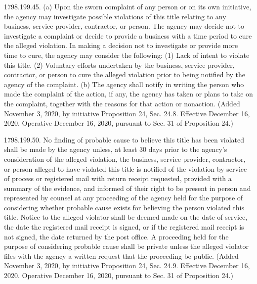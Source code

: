 1798.199.45.  (a) Upon the sworn complaint of any person or on its own initiative, the agency may investigate possible violations of this title relating to any business, service provider, contractor, or person. The agency may decide not to investigate a complaint or decide to provide a business with a time period to cure the alleged violation. In making a decision not to investigate or provide more time to cure, the agency may consider the following:
(1) Lack of intent to violate this title.
(2) Voluntary efforts undertaken by the business, service provider, contractor, or person to cure the alleged violation prior to being notified by the agency of the complaint.
(b) The agency shall notify in writing the person who made the complaint of the action, if any, the agency has taken or plans to take on the complaint, together with the reasons for that action or nonaction.
(Added November 3, 2020, by initiative Proposition 24, Sec. 24.8. Effective December 16, 2020. Operative December 16, 2020, pursuant to Sec. 31 of Proposition 24.)

1798.199.50.  No finding of probable cause to believe this title has been violated shall be made by the agency unless, at least 30 days prior to the agency’s consideration of the alleged violation, the business, service provider, contractor, or person alleged to have violated this title is notified of the violation by service of process or registered mail with return receipt requested, provided with a summary of the evidence, and informed of their right to be present in person and represented by counsel at any proceeding of the agency held for the purpose of considering whether probable cause exists for believing the person violated this title. Notice to the alleged violator shall be deemed made on the date of service, the date the registered mail receipt is signed, or if the registered mail receipt is not signed, the date returned by the post office. A proceeding held for the purpose of considering probable cause shall be private unless the alleged violator files with the agency a written request that the proceeding be public.
(Added November 3, 2020, by initiative Proposition 24, Sec. 24.9. Effective December 16, 2020. Operative December 16, 2020, pursuant to Sec. 31 of Proposition 24.)

